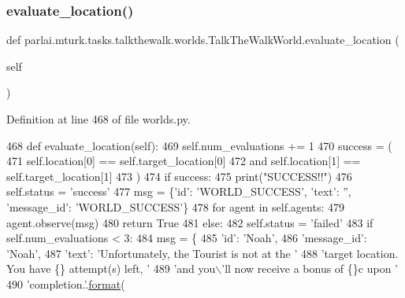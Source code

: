 \subsubsection{\texorpdfstring{evaluate\+\_\+location()}{evaluate\_location()}}
{\footnotesize\ttfamily def parlai.\+mturk.\+tasks.\+talkthewalk.\+worlds.\+Talk\+The\+Walk\+World.\+evaluate\+\_\+location (\begin{DoxyParamCaption}\item[{}]{self }\end{DoxyParamCaption})}



Definition at line 468 of file worlds.\+py.


\begin{DoxyCode}
468     \textcolor{keyword}{def }evaluate\_location(self):
469         self.num\_evaluations += 1
470         success = (
471             self.location[0] == self.target\_location[0]
472             \textcolor{keywordflow}{and} self.location[1] == self.target\_location[1]
473         )
474         \textcolor{keywordflow}{if} success:
475             print(\textcolor{stringliteral}{"SUCCESS!!"})
476             self.status = \textcolor{stringliteral}{'success'}
477             msg = \{\textcolor{stringliteral}{'id'}: \textcolor{stringliteral}{'WORLD\_SUCCESS'}, \textcolor{stringliteral}{'text'}: \textcolor{stringliteral}{''}, \textcolor{stringliteral}{'message\_id'}: \textcolor{stringliteral}{'WORLD\_SUCCESS'}\}
478             \textcolor{keywordflow}{for} agent \textcolor{keywordflow}{in} self.agents:
479                 agent.observe(msg)
480             \textcolor{keywordflow}{return} \textcolor{keyword}{True}
481         \textcolor{keywordflow}{else}:
482             self.status = \textcolor{stringliteral}{'failed'}
483             \textcolor{keywordflow}{if} self.num\_evaluations < 3:
484                 msg = \{
485                     \textcolor{stringliteral}{'id'}: \textcolor{stringliteral}{'Noah'},
486                     \textcolor{stringliteral}{'message\_id'}: \textcolor{stringliteral}{'Noah'},
487                     \textcolor{stringliteral}{'text'}: \textcolor{stringliteral}{'Unfortunately, the Tourist is not at the '}
488                     \textcolor{stringliteral}{'target location. You have \{\} attempt(s) left, '}
489                     \textcolor{stringliteral}{'and you\(\backslash\)'ll now receive a bonus of \{\}c upon '}
490                     \textcolor{stringliteral}{'completion.'}.\hyperlink{namespaceparlai_1_1chat__service_1_1services_1_1messenger_1_1shared__utils_a32e2e2022b824fbaf80c747160b52a76}{format}(

\end{DoxyCode}
